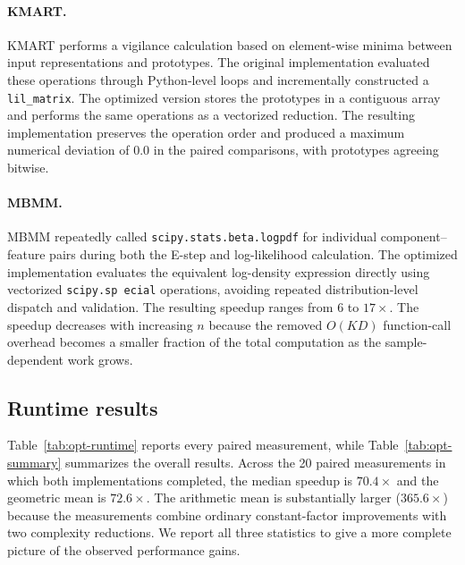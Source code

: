 \documentclass[twoside,11pt]{article}
\begin{document}
\paragraph{KMART.}
KMART performs a vigilance calculation based on element-wise minima between
input representations and prototypes. The original implementation evaluated
these operations through Python-level loops and incrementally constructed a
\texttt{lil\_matrix}. The optimized version stores the prototypes in a
contiguous array and performs the same operations as a vectorized reduction.
The resulting implementation preserves the operation order and produced a
maximum numerical deviation of $0.0$ in the paired comparisons, with
prototypes agreeing bitwise.

\paragraph{MBMM.}
MBMM repeatedly called \texttt{scipy.stats.beta.logpdf} for individual
component--feature pairs during both the E-step and log-likelihood
calculation. The optimized implementation evaluates the equivalent
log-density expression directly using vectorized \texttt{scipy.sp ecial}
operations, avoiding repeated distribution-level dispatch and validation.
The resulting speedup ranges from $6$ to $17\times$. The speedup decreases
with increasing $n$ because the removed $O(KD)$ function-call overhead becomes
a smaller fraction of the total computation as the sample-dependent work
grows.

\subsection{Runtime results}

Table~\ref{tab:opt-runtime} reports every paired measurement, while
Table~\ref{tab:opt-summary} summarizes the overall results. Across the 20
paired measurements in which both implementations completed, the median
speedup is $70.4\times$ and the geometric mean is $72.6\times$. The arithmetic
mean is substantially larger ($365.6\times$) because the measurements combine
ordinary constant-factor improvements with two complexity reductions. We
report all three statistics to give a more complete picture of the observed
performance gains.
\end{document}

